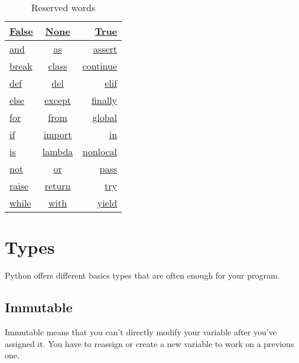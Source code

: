 \documentclass[a4paper, 12pt, titlepage]{scrartcl} %
\begin{document}
\begin{table}[h]
\begin{center}
{\renewcommand{\arraystretch}{2} %
{\setlength{\tabcolsep}{1.5cm} %
\begin{tabular}{|l|c|r|}
  \hline
  \hyperref[subsec:Bool]{False} & \hyperref[subsec:Keyword]{None} & \hyperref[subsec:Bool]{True} \\
  \hline
  \hyperref[subsec:Keyword]{and} & \hyperref[As]{as} & \hyperref[subsec:Assertion]{assert} \\
  \hline
  \hyperref[subsec:BCPR]{break} & \hyperref[sec:Class]{class} & \hyperref[subsec:BCPR]{continue} \\
  \hline
  \hyperref[sec:Function]{def} & \hyperref[Del]{del} & \hyperref[IEE]{elif} \\
  \hline
  \hyperref[subsec:Else]{else} & \hyperref[TEEF]{except} & \hyperref[TEEF]{finally} \\
  \hline
  \hyperref[subsec:For]{for} & \hyperref[subsec:Import]{from} & \hyperref[subsec:Global/Nonlocal]{global} \\
  \hline
  \hyperref[IEE]{if} & \hyperref[subsec:Import]{import} & \hyperref[Comprehension]{in} \\
  \hline
  \hyperref[subsec:Is]{is} & \hyperref[subsec:Lambda]{lambda} & \hyperref[subsec:Global/Nonlocal]{nonlocal} \\
  \hline 
  \hyperref[subsec:Keyword]{not} & \hyperref[subsec:Keyword]{or} & \hyperref[subsec:BCPR]{pass} \\
  \hline 
  \hyperref[Raise]{raise} & \hyperref[subsec:BCPR]{return} & \hyperref[TEEF]{try} \\
  \hline
  \hyperref[subsec:While]{while} & \hyperref[subsec:ContextManager]{with} & \hyperref[subsec:Generators]{yield} \\
  \hline
\end{tabular}}}
\end{center}
\caption{Reserved words}
\end{table} \vspace{5mm}



\clearpage
\section{Types}
Python offers different basics types that are often enough for your program.

\subsection{Immutable}
Immutable means that you can't directly modify your variable after you've assigned it. You have to reassign or create a new variable to work on a previous one.
\end{document}
